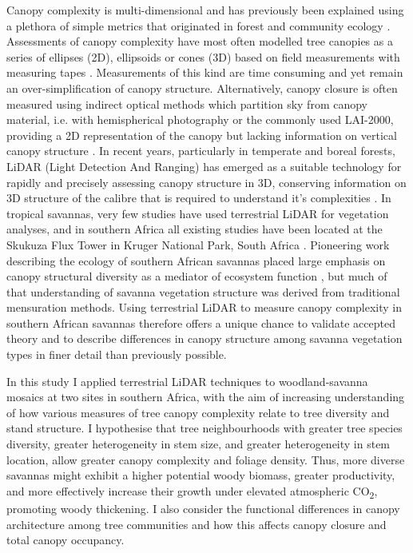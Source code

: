 \documentclass[11pt,a4paper]{article}
\begin{document}
Canopy complexity is multi-dimensional and has previously been explained using a plethora of simple metrics that originated in forest and community ecology \citep{Kershaw2017}. Assessments of canopy complexity have most often modelled tree canopies as a series of ellipses (2D), ellipsoids or cones (3D) based on field measurements with measuring tapes \citep{Jucker2015}. Measurements of this kind are time consuming and yet remain an over-simplification of canopy structure. Alternatively, canopy closure is often measured using indirect optical methods which partition sky from canopy material, i.e. with hemispherical photography or the commonly used LAI-2000, providing a 2D representation of the canopy but lacking information on vertical canopy structure \citep{Jonckheere2004}. In recent years, particularly in temperate and boreal forests, LiDAR (Light Detection And Ranging) has emerged as a suitable technology for rapidly and precisely assessing canopy structure in 3D, conserving information on 3D structure of the calibre that is required to understand it's complexities \citep{Muir2018, Calders2020}. In tropical savannas, very few studies have used terrestrial LiDAR for vegetation analyses, and in southern Africa all existing studies have been located at the Skukuza Flux Tower in Kruger National Park, South Africa \citep{Muumbe2021}. Pioneering work describing the ecology of southern African savannas placed large emphasis on canopy structural diversity as a mediator of ecosystem function \citep{Solbrig1996}, but much of that understanding of savanna vegetation structure was derived from traditional mensuration methods. Using terrestrial LiDAR to measure canopy complexity in southern African savannas therefore offers a unique chance to validate accepted theory and to describe differences in canopy structure among savanna vegetation types in finer detail than previously possible.

In this study I applied terrestrial LiDAR techniques to woodland-savanna mosaics at two sites in southern Africa, with the aim of increasing understanding of how various measures of tree canopy complexity relate to tree diversity and stand structure. I hypothesise that tree neighbourhoods with greater tree species diversity, greater heterogeneity in stem size, and greater  heterogeneity in stem location, allow greater canopy complexity and foliage density. Thus, more diverse savannas might exhibit a higher potential woody biomass, greater productivity, and more effectively increase their growth under elevated atmospheric CO\textsubscript{2}, promoting woody thickening. I also consider the functional differences in canopy architecture among tree communities and how this affects canopy closure and total canopy occupancy.
\end{document}
